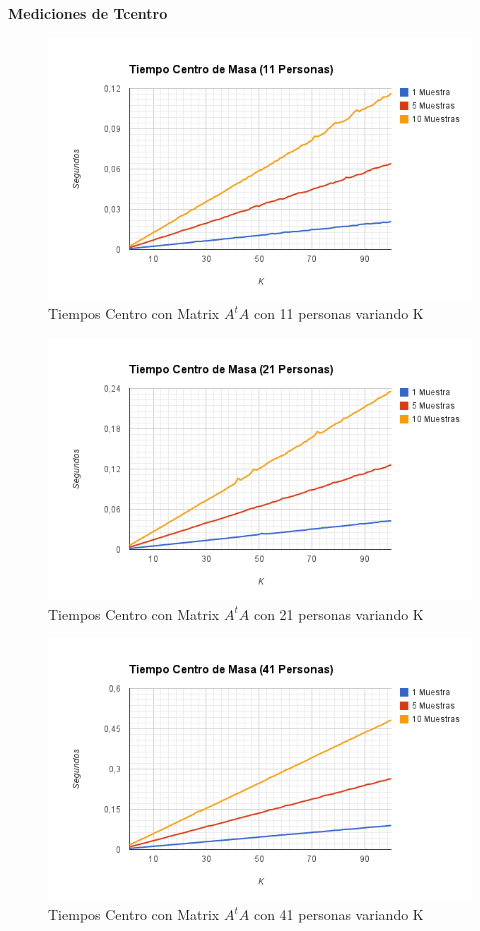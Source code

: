 \textbf{Mediciones de Tcentro }

\begin{figure}[H]
\includegraphics[width=1\textwidth]{img/image7.png}
     \caption{Tiempos Centro con Matrix $A^tA$ con 11 personas variando K}
\end{figure}

\begin{figure}[H]
\includegraphics[width=1\textwidth]{img/image8.png}
     \caption{Tiempos Centro con Matrix $A^tA$ con 21 personas variando K}
\end{figure}

\begin{figure}[H]
\includegraphics[width=1\textwidth]{img/image9.png}
     \caption{Tiempos Centro con Matrix $A^tA$ con 41 personas variando K}
\end{figure}

